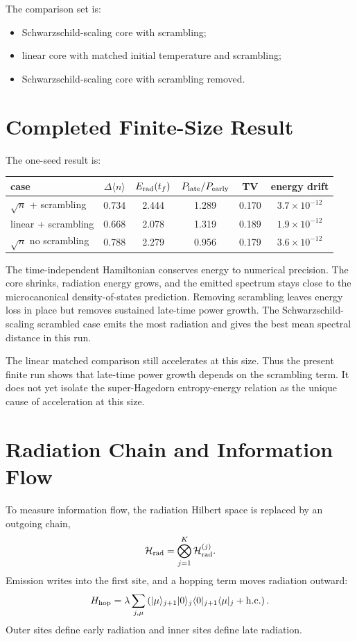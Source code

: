 \documentclass[12pt]{article}
\newcommand{\Hrad}{\mathcal H_{\rm rad}}
\newcommand{\ket}[1]{|#1\rangle}
\newcommand{\bra}[1]{\langle #1|}
\begin{document}
The comparison set is:
\begin{itemize}
    \item Schwarzschild-scaling core with scrambling;
    \item linear core with matched initial temperature and scrambling;
    \item Schwarzschild-scaling core with scrambling removed.
\end{itemize}

\section{Completed Finite-Size Result}

The one-seed result is:
\begin{center}
\begin{tabular}{lccccc}
\toprule
case & $\Delta\langle n\rangle$ & $E_{\rm rad}(t_f)$
& $P_{\rm late}/P_{\rm early}$ & TV & energy drift\\
\midrule
$\sqrt n$ + scrambling & 0.734 & 2.444 & 1.289 & 0.170 & $3.7\times10^{-12}$\\
linear + scrambling    & 0.668 & 2.078 & 1.319 & 0.189 & $1.9\times10^{-12}$\\
$\sqrt n$ no scrambling & 0.788 & 2.279 & 0.956 & 0.179 & $3.6\times10^{-12}$\\
\bottomrule
\end{tabular}
\end{center}

The time-independent Hamiltonian conserves energy to numerical precision.  The core
shrinks, radiation energy grows, and the emitted spectrum stays close to the
microcanonical density-of-states prediction.  Removing scrambling leaves
energy loss in place but removes sustained late-time power growth.  The
Schwarzschild-scaling scrambled case emits the most radiation and gives the
best mean spectral distance in this run.

The linear matched comparison still accelerates at this size.  Thus the present
finite run shows that late-time power growth depends on the scrambling term.  It does
not yet isolate the super-Hagedorn entropy-energy relation as the unique cause
of acceleration at this size.

\section{Radiation Chain and Information Flow}

To measure information flow, the radiation Hilbert space is replaced by an
outgoing chain,
\begin{equation}
    \Hrad=\bigotimes_{j=1}^{K}\Hrad^{(j)} .
\end{equation}
Emission writes into the first site, and a hopping term moves radiation outward:
\begin{equation}
    H_{\rm hop}
    =
    \lambda\sum_{j,\mu}
    \left(
    \ket{\mu}_{j+1}\ket{0}_j\bra{0}_{j+1}\bra{\mu}_j
    +{\rm h.c.}
    \right).
\end{equation}
Outer sites define early radiation and inner sites define late radiation.
\end{document}

